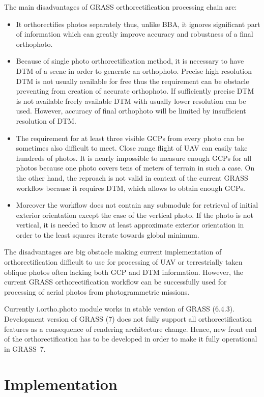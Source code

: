 \documentclass[a4paper,12pt]{article}
\begin{document}
The main disadvantages of GRASS orthorectification processing chain are:
\begin{itemize}
\item It orthorectifies photos separately thus, unlike BBA, it ignores significant part of information
 which can greatly improve accuracy and robustness of a final orthophoto. 
\item Because of single photo orthorectification method, it is necessary to have DTM of a scene
in order to generate an orthophoto. Precise high resolution DTM is not usually available for free thus the 
requirement can be obstacle preventing from creation of accurate orthophoto. If sufficiently precise 
DTM is not available freely available DTM with usually lower resolution can be used. However,  
accuracy of final orthophoto will be limited by insufficient resolution of DTM.
\item The requirement for at least three visible GCPs from every photo can be sometimes also difficult to meet.
Close range flight of UAV can easily take hundreds of photos.
It is nearly impossible to measure enough GCPs for all photos because  
one photo covers tens of meters of terrain in such a case. 
On the other hand, the reproach is not valid in context of the current GRASS workflow because it requires DTM, which allows 
to obtain enough GCPs.
\item Moreover the workflow does not contain any submodule for retrieval of initial exterior orientation except
 the case of the vertical photo.   If the photo 
is not vertical, it is needed to know at least approximate exterior orientation 
in order to the least squares iterate towards global minimum.
\end{itemize}

The disadvantages are big obstacle making current implementation of orthorectification difficult to use  
for processing of  UAV or terrestrially taken oblique photos often lacking both GCP and DTM information.
However, the current GRASS orthorectification workflow can be successfully used for processing
of aerial photos from photogrammetric missions.

Currently i.ortho.photo module works in stable version of GRASS (6.4.3).
Development version of GRASS (7) does not fully support all orthorectification features 
as a consequence of rendering architecture change.
Hence, new front end of the
orthorectification has to be developed in order to make it fully operational 
in GRASS~7. 

\newpage
\section{Implementation}
\end{document}
